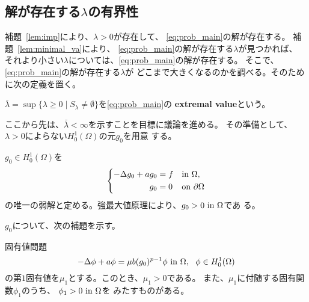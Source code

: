 \subsection{解が存在する$\lambda$の有界性}

補題~\ref{lem:imp}により、$\lambda > 0$が存在して、
\ref{eq:prob_main}の解が存在する。
補題~\ref{lem:minimal_va}により、
\ref{eq:prob_main}の解が存在する$\lambda$が見つかれば、
それより小さい$\lambda$については、\ref{eq:prob_main}の解が存在する。
そこで、\ref{eq:prob_main}の解が存在する$\lambda$が
どこまで大きくなるのかを調べる。そのために次の定義を置く。

\begin{defn} \label{defn:ext}
 $\bar{\lambda} = \sup \{ \lambda \geq 0 \mid S_\lambda \neq \emptyset
 \}$を\ref{eq:prob_main}の {\bf extremal value}という。
\end{defn}

ここから先は、$\bar{\lambda} < \infty$を示すことを目標に議論を進める。
その準備として、$\lambda > 0$によらない$H_0^1(\Omega)$の元$g_0$を用意
する。

\begin{nota} \label{nota:g_0}
 $g_0 \in H_0^1(\Omega)$を
 \begin{align}
  \left\{
  \begin{aligned}
   -\Delta g_0 + a g_0 
    &= f  & &\text{in}~ \Omega,  \\
   g_0 &= 0 & &\text{on}~ \partial\Omega
  \end{aligned}
  \right. \label{eq:g_0}
 \end{align}
 の唯一の弱解と定める。強最大値原理により、$g_0 > 0 ~\text{in}~ \Omega$であ
 る。
\end{nota}
 
$g_0$について、次の補題を示す。

\begin{lem} \label{lem:g_0}
 固有値問題
 \[
  -\Delta \phi + a \phi = \mu b (g_0)^{p-1}\phi ~\text{in}~ \Omega, \ \
 \phi \in H_0^1(\Omega)
 \]
 の第$1$固有値を$\mu_1$とする。このとき、$\mu_1 > 0$である。
 また、$\mu_1$に付随する固有関数$\phi_1$のうち、
 $\phi_1 > 0 ~\text{in}~ \Omega$を
 みたすものがある。
\end{lem}

